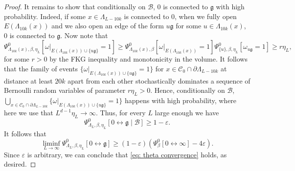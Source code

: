 \documentclass[11pt,a4paper]{article}
\theoremstyle{definition}
\numberwithin{equation}{section}
\newcommand\fg{\mathfrak{g}}
\begin{document}
\begin{proof}
It remains to show that conditionally on $\mathcal{B}$, $0$ is connected to $\fg$ with high probability.
Indeed, if some $x\in \Lambda_{L-10k}$ is connected to $0$, when we fully open $E(\Lambda_{10k}(x))$ and we also open an edge of the form $u\fg$ for some $u \in \Lambda_{10k}(x)$, $0$ is connected to $\fg$. Now note that 
\begin{equation}
\Psi^0_{\Lambda_{10k}(x),\beta,\eta_L}[\omega|_{E(\Lambda_{10k}(x))\cup\{u\fg\}}=1]\geq \Psi^0_{\Lambda_{10k}(x),\beta}[\omega|_{E(\Lambda_{10k}(x))}=1]
\Psi^0_{\{u\},\beta,\eta_L}[\omega_{u\fg}=1]\geq r\eta_L,
\end{equation}
for some $r>0$ by the FKG inequality and monotonicity in the volume.
It follows that the family of events $\{\omega|_{E(\Lambda_{10k}(x))\cup\{u\fg\}}=1\}$ for $x\in \mathcal{C}_0\cap \partial \Lambda_{L-10k}$ at distance at least $20k$ apart from each other stochastically dominates a sequence of Bernoulli random variables of parameter $r\eta_L>0$. Hence, conditionally on $\mathcal{B}$, $\bigcup_{x\in \mathcal{C}_0\cap \partial \Lambda_{L-10k}}\{\omega|_{E(\Lambda_{10k}(x))\cup\{u\fg\}}=1\}$ happens with high probability, where here we use that $L^{d-1}\eta_L\to\infty$. 
Thus, for every $L$ large enough we have 
\begin{equation}
\Psi^0_{\Lambda_L,\beta,\eta_L}[0\longleftrightarrow\fg \mid \mathcal{B}]\geq 1-\varepsilon.    
\end{equation}
It follows that
\begin{equation}
\liminf_{L\to\infty}\Psi^0_{\Lambda_L,\beta,\eta_L}[0\longleftrightarrow\fg]\geq (1-\varepsilon)(\Psi^0_{\beta}[0\longleftrightarrow \infty]-4\varepsilon).
\end{equation}
Since $\varepsilon$ is arbitrary, we can conclude that
\eqref{eq: theta convergence} holds, as desired. 
\end{proof}
\end{document}
